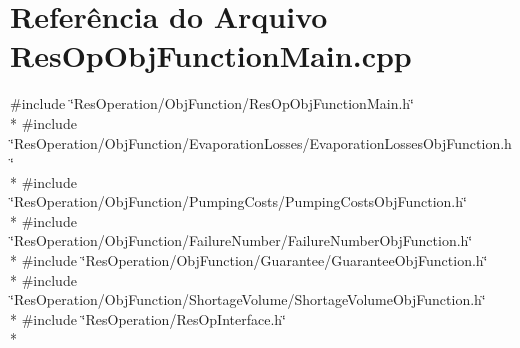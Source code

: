 \section{Referência do Arquivo Res\+Op\+Obj\+Function\+Main.\+cpp}
\label{_res_op_obj_function_main_8cpp}
{\ttfamily \#include \char`\"{}Res\+Operation/\+Obj\+Function/\+Res\+Op\+Obj\+Function\+Main.\+h\char`\"{}}\\*
{\ttfamily \#include \char`\"{}Res\+Operation/\+Obj\+Function/\+Evaporation\+Losses/\+Evaporation\+Losses\+Obj\+Function.\+h\char`\"{}}\\*
{\ttfamily \#include \char`\"{}Res\+Operation/\+Obj\+Function/\+Pumping\+Costs/\+Pumping\+Costs\+Obj\+Function.\+h\char`\"{}}\\*
{\ttfamily \#include \char`\"{}Res\+Operation/\+Obj\+Function/\+Failure\+Number/\+Failure\+Number\+Obj\+Function.\+h\char`\"{}}\\*
{\ttfamily \#include \char`\"{}Res\+Operation/\+Obj\+Function/\+Guarantee/\+Guarantee\+Obj\+Function.\+h\char`\"{}}\\*
{\ttfamily \#include \char`\"{}Res\+Operation/\+Obj\+Function/\+Shortage\+Volume/\+Shortage\+Volume\+Obj\+Function.\+h\char`\"{}}\\*
{\ttfamily \#include \char`\"{}Res\+Operation/\+Res\+Op\+Interface.\+h\char`\"{}}\\*
